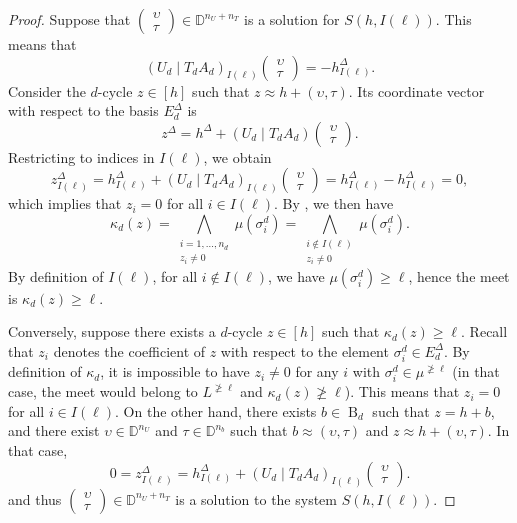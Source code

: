 \documentclass[a4paper,10pt]{article}
\newcommand{\bbd}{\mathbb{D}}
\newcommand{\E}{E^\Delta}
\DeclareMathOperator{\Bo}{B}
\begin{document}
\begin{proof}
Suppose that 
\(\left(\begin{array}{c}\upsilon \\ \tau\end{array}\right)\in \bbd^{n_U+n_T}\)
is a solution for \(S(h,I(\ell))\). This means that
\[
(U_{d} \mid T_{d} A_{d})_{I(\ell)}
\left(\begin{array}{c}\upsilon \\ \tau\end{array}\right)= -h^{\Delta}_{I(\ell)}.
\]
Consider the \(d\)-cycle \(z \in [h]\) such that \(z \approx h+(\upsilon,\tau)\). Its coordinate vector with respect to the basis \(\E_d\) is
\[
z^\Delta = h^\Delta + (U_{d} \mid T_{d}A_{d})
\left(\begin{array}{c}\upsilon \\\tau\end{array}\right).
\]
Restricting to indices in \(I(\ell)\), we obtain
\[
z^\Delta_{I(\ell)} = h^\Delta_{I(\ell)} + (U_{d} \mid T_{d} A_{d})_{I(\ell)}
\left(\begin{array}{c}\upsilon \\\tau\end{array}\right)
= h^\Delta_{I(\ell)} -h^\Delta_{I(\ell)} = 0,
\]
which implies that \(z_i = 0\) for all \(i \in I(\ell)\). By , we then have
\[
\kappa_d(z) = \bigwedge_{\substack{i=1,\ldots,n_d \\ z_i \neq 0}} \mu(\sigma^{d}_{i}) = \bigwedge_{\substack{i \notin I(\ell) \\ z_i \neq 0}} \mu(\sigma^{d}_{i}).
\]
By definition of \(I(\ell)\), for all \(i \notin I(\ell)\), we have \(\mu(\sigma^{d}_{i}) \geq \ell\), hence the meet is \(\kappa_d(z) \geq \ell\).

Conversely, suppose there exists a \(d\)-cycle \(z \in [h]\) such that \(\kappa_d(z) \geq \ell\). 
Recall that \(z_i\) denotes the coefficient of \(z\) with respect to the element \(\sigma^d_i \in E^\Delta_d\).
By definition of \(\kappa_d\), it is impossible to have \(z_i \neq 0\) for any \(i\) with \(\sigma^{d}_{i} \in \mu^{\not \geq \ell}\) (in that case, the meet would belong to \(L^{\not \geq \ell}\) and \(\kappa_d(z)\not\geq \ell\)). This means that \(z_i = 0\) for all \(i \in I(\ell)\). On the other hand, there exists \(b \in \Bo_d\) such that \(z=h+b\), and there exist \(\upsilon \in \bbd^{n_U}\) and \(\tau \in \bbd^{n_b}\) such that \(b \approx (\upsilon,\tau)\) and \(z \approx h+(\upsilon,\tau)\). In that case, 
\[
0=z^\Delta_{I(\ell)} = h^\Delta_{I(\ell)} + (U_{d} \mid T_{d}A_{d})_{I(\ell)}
\left(\begin{array}{c}\upsilon \\ \tau\end{array}\right).
\]
and thus 
\(\left(\begin{array}{c}\upsilon \\ \tau\end{array}\right) \in \bbd^{n_U+n_T}\)
is a solution to the system \(S(h, I(\ell))\).
\end{proof}
\end{document}
